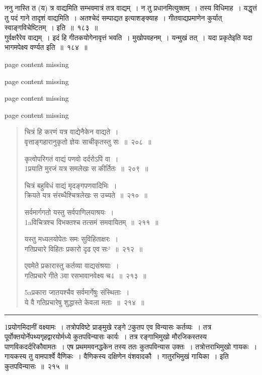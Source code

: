\documentclass[11pt, openany]{book}
\begin{document}
ननु नास्ति त (य) त्र वाद्यमिति सम्भवमात्रं तत्र वाद्यम्~। न तु प्रधानमित्युक्तम्~। तस्य विधिमाह~। यद्धृत्तं तु पदं गाने तादृशं वाद्यमिति~। अतश्चेदं सम्पाद्यत इत्याशङ्क्याह~।  गीतवाद्यप्रमाणेन कुर्यात् स्वाङ्गविचेष्टितम्~। इति~॥~१८३~॥\\

गुर्वक्षरैरेव वाद्यम्~। इदं हि गीतकयोगेनावृत्तं भवति~। {\qtt मुखोपवहनम्}~। यन्मुखं तत्~। यदा प्रकृतेइति यदा भागमपेक्ष्य वर्ण्यत इति~॥~१८४~॥

\newpage
page content missing

\newpage
page content missing

\newpage
page content missing

\newpage
page content missing

\newpage

\begin{quote}
{\na   चित्रं हि करणं यत्र वाद्येनैकेन वाद्यते~।\\
 वृत्ताङ्गहारानुकृतो ज्ञेयः साचीकृतस्तु सः~॥~२०८~॥

 कृत्वोपरिगतं वाद्यं पणवो दर्दरोऽपि वा~।\\
 1प्रयाति मुरजं यत्र समलेखः स कीर्तितः~॥~२०९~॥

 चित्रं बहुविधं वाद्यं मृदङ्गपणवादिभिः~।\\
 क्रियते यत्र संरब्धैश्चित्रलेखः स उच्यते~॥~२१०~॥

 सर्वमार्गगतो यस्तु सर्वपाणिलयाश्रयः~।\\
 1aविचित्रश्च विभक्तश्च तत्समं समवायितम्~॥~२११~॥

 यस्तु मध्यलयोपेतः समः सुविहिताक्षरः~।\\
 गतिप्रचारे विहितः प्रकारो दृढ एव सः²~॥~२१२~॥

 एवमेते प्रकारास्तु कर्तव्या वाद्यसंश्रयाः~।\\
 गतिप्रचारे गीते 3वा रसभावानवेक्ष्य च4~॥~२१३~॥

 5aप्रकारा जातयश्चैव सर्वमार्गेषुः संस्थिताः~।\\
 ये वै गतिप्रचारेषु शुद्धास्ते केवला मताः~॥~२१४~॥}
\end{quote}

\hrule


\newpage

{\qt  1प्रयोगमिदानीं वक्ष्यामः~। तत्रोपविष्टे प्राङ्मुखे रङ्गे 2कुतप एव विन्यासः कर्तव्यः~। तत्र पूर्वोक्तयोर्नेपथ्यगृहद्वारयोर्मध्ये कुतपविन्यासः कार्यः~। तत्र रङ्गाभिमुखो मौरजिकस्तस्य पाणविकदर्दरिकौवामतः~। एष प्रथममवनद्धकेन तस्य ततः कुतपविन्यास उक्तः~। तत्रोत्तराभिमुखो गायकः~। गायकस्य तु वामपार्श्वे वैणिकः~। वैणिकस्य दक्षिणेन वंशवादकौ~। गातुरभिमुखं गायिका~। इति कुतपविन्यासः~॥~२१५~॥}\\
\end{document}
